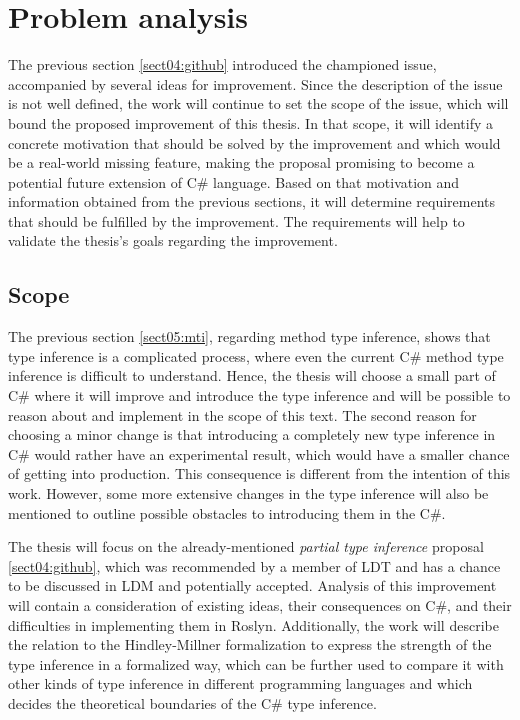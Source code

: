 \chapter{Problem analysis}

The previous section \ref{sect04:github} introduced the championed issue, accompanied by several ideas for improvement.
Since the description of the issue is not well defined, the work will continue to set the scope of the issue, which will bound the proposed improvement of this thesis. 
In that scope, it will identify a concrete motivation that should be solved by the improvement and which would be a real-world missing feature, making the proposal promising to become a potential future extension of C\# language. 
Based on that motivation and information obtained from the previous sections, it will determine requirements that should be fulfilled by the improvement. 
The requirements will help to validate the thesis’s goals regarding the improvement.

\section{Scope}

The previous section \ref{sect05:mti}, regarding method type inference, shows that type inference is a complicated process, where even the current C\# method type inference is difficult to understand. 
Hence, the thesis will choose a small part of C\# where it will improve and introduce the type inference and will be possible to reason about and implement in the scope of this text. 
The second reason for choosing a minor change is that introducing a completely new type inference in C\# would rather have an experimental result, which would have a smaller chance of getting into production. 
This consequence is different from the intention of this
work. 
However, some more extensive changes in the type inference will also be mentioned to outline possible obstacles to introducing them in the C\#.
\par
The thesis will focus on the already-mentioned \textit{partial type inference} proposal \ref{sect04:github}, which was recommended by a member of \ac{LDT} and has a chance to be discussed in \ac{LDM} and potentially accepted. 
Analysis of this improvement will contain a consideration of existing ideas, their consequences on C\#, and their difficulties in implementing them in Roslyn. 
Additionally, the work will describe the relation to the Hindley-Millner formalization to express the strength of the type inference in a formalized way, which can be further used to compare it with other kinds of type inference in different programming languages and which decides the theoretical boundaries of the C\# type inference.

